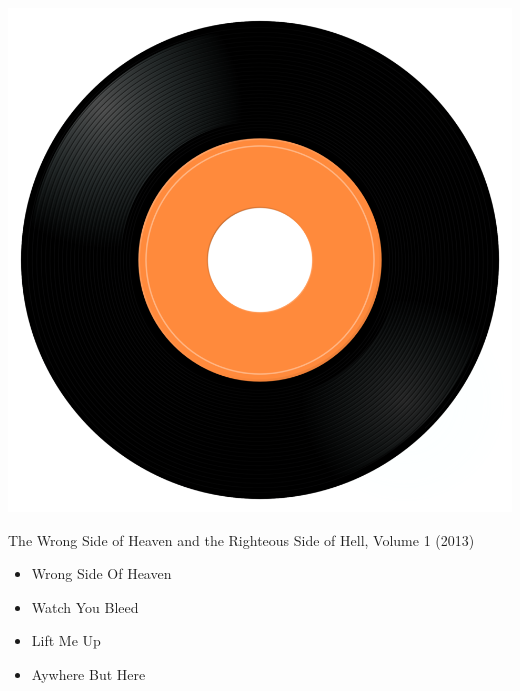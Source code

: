 \begin{minipage}[t]{0.25\textwidth}
\captionsetup{type=figure}
\includegraphics[width=\textwidth]{Images/cover.png}
\caption*{The Wrong Side of Heaven and the Righteous Side of Hell, Volume 1 (2013)}
\end{minipage}
\begin{minipage}[t]{0.25\textwidth}\vspace{0pt}
\begin{itemize}[nosep,leftmargin=1em,labelwidth=*,align=left]
	\setlength{\itemsep}{0pt}
	\item Wrong Side Of Heaven
	\item Watch You Bleed
	\item Lift Me Up
	\item Aywhere But Here
\end{itemize}
\end{minipage}
